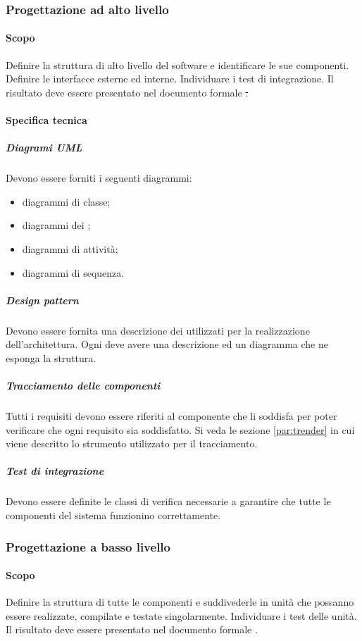             \subsubsection{Progettazione ad alto livello}
                \paragraph{Scopo}
                Definire la struttura di alto livello del software e identificare le sue componenti. Definire le interfacce esterne ed interne. Individuare i test di integrazione. Il risultato deve essere presentato nel documento formale \st.
                \paragraph{Specifica tecnica}
                \subparagraph{Diagrami UML}
                Devono essere forniti i seguenti diagrammi:
                \begin{itemize}
                    \item diagrammi di classe;
                    \item diagrammi dei ;
                    \item diagrammi di attività;
                    \item diagrammi di sequenza.
                \end{itemize}
                \subparagraph{Design pattern}
                Devono essere fornita una descrizione dei  utilizzati per la realizzazione dell'architettura. Ogni  deve avere una descrizione ed un diagramma che ne esponga la struttura.
                \subparagraph{Tracciamento delle componenti}
                Tutti i requisiti devono essere riferiti al componente che li soddisfa per poter verificare che ogni requisito sia soddisfatto. Si veda le sezione \ref{par:trender} in cui viene descritto lo strumento utilizzato per il tracciamento.
                \subparagraph{Test di integrazione}
                Devono essere definite le classi di verifica necessarie a garantire che tutte le componenti del sistema funzionino correttamente.
            \subsubsection{Progettazione a basso livello}
                \paragraph{Scopo}
                Definire la struttura di tutte le componenti e suddivederle in unità che possanno essere realizzate, compilate e testate singolarmente. Individuare i test delle unità. Il risultato deve essere presentato nel documento formale \ddp.
